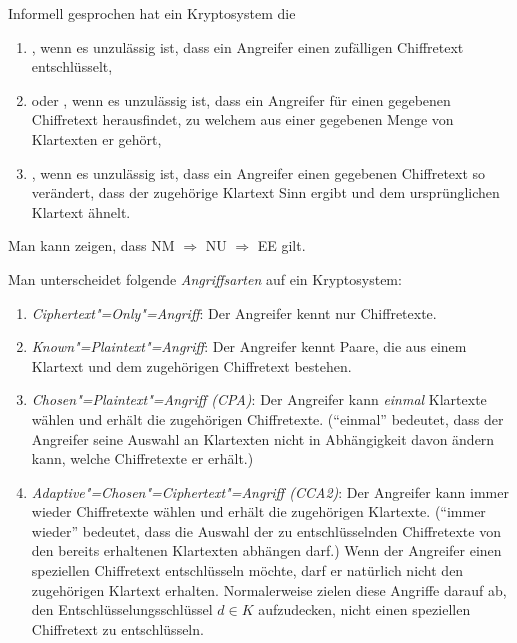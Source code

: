 \begin{definition}[Sicherheitseigenschaften]\label{def:securitymodel}
 Informell gesprochen hat ein Kryptosystem die 
 \begin{enumerate}
  \item {}, wenn es unzulässig ist, dass ein Angreifer einen zufälligen Chiffretext entschlüsselt,
  \item {} oder , wenn es unzulässig ist, dass ein Angreifer für einen gegebenen Chiffretext herausfindet, zu welchem aus einer gegebenen Menge von Klartexten er gehört,
  \item {}, wenn es unzulässig ist, dass ein Angreifer einen gegebenen Chiffretext so verändert, dass der zugehörige Klartext Sinn ergibt und dem ursprünglichen Klartext ähnelt.
 \end{enumerate}
\end{definition}

\begin{remark}
 Man kann zeigen, dass NM $\Rightarrow$ NU $\Rightarrow$ EE gilt.
\end{remark}

\begin{definition}[Angriffsarten]
 Man unterscheidet folgende \emph{Angriffsarten} auf ein Kryptosystem:
 \begin{enumerate}
  \item \emph{Ciphertext"=Only"=Angriff}: Der Angreifer kennt nur Chiffretexte.
  \item \emph{Known"=Plaintext"=Angriff}: Der Angreifer kennt Paare, die aus einem Klartext und dem zugehörigen Chiffretext bestehen.
  \item \emph{Chosen"=Plaintext"=Angriff (CPA)}: Der Angreifer kann \emph{einmal} Klartexte wählen und erhält die zugehörigen Chiffretexte. (\enquote{einmal} bedeutet, dass der Angreifer seine Auswahl an Klartexten nicht in Abhängigkeit davon ändern kann, welche Chiffretexte er erhält.)
  \item \emph{Adaptive"=Chosen"=Ciphertext"=Angriff (CCA2)}: Der Angreifer kann immer wieder Chiffretexte wählen und erhält die zugehörigen Klartexte. (\enquote{immer wieder} bedeutet, dass die Auswahl der zu entschlüsselnden Chiffretexte von den bereits erhaltenen Klartexten abhängen darf.) Wenn der Angreifer einen speziellen Chiffretext entschlüsseln möchte, darf er natürlich nicht den zugehörigen Klartext erhalten. Normalerweise zielen diese Angriffe darauf ab, den Entschlüsselungsschlüssel $d \in K$ aufzudecken, nicht einen speziellen Chiffretext zu entschlüsseln.
 \end{enumerate}
\end{definition}

